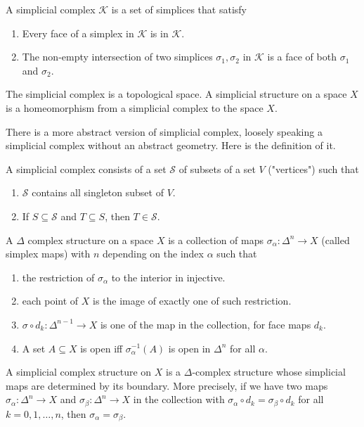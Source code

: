 \begin{definition}
	A simplicial complex \(\mathcal K\) is a set of simplices that satisfy
		\begin{enumerate}
			\item Every face of a simplex in \(\mathcal K\) is in \(\mathcal K\).
			\item The non-empty intersection of two simplices \(\sigma_1, \sigma_2\) in \(\mathcal K\) is a face of both \(\sigma_1\) and \(\sigma_2\). 
		\end{enumerate}
	The simplicial complex is a topological space.
	A simplicial structure on a space \(X\) is a homeomorphism from a simplicial complex to the space \(X\).
	
	There is a more abstract version of simplicial complex, loosely speaking a simplicial complex without an abstract geometry. Here is the definition of it.
	
	A simplicial complex consists of a set \(\mathcal S\) of subsets of a set \(V\) ("vertices") such that 
	\begin{enumerate}
		\item \(\mathcal S\) contains all singleton subset of \(V\).
		\item If \(S \subseteq \mathcal S\) and \(T \subseteq S\), then \(T \in \mathcal S\).
	\end{enumerate}
\end{definition}


\begin{definition}
	A \(\Delta\) complex structure on a space \(X\)	is a collection of maps \(\sigma_\alpha: \Delta^n \to X\) (called simplex maps) with \(n\) depending on the index \(\alpha\) such that 
	\begin{enumerate}
		\item the restriction of \(\sigma_\alpha\) to the interior in injective.
		\item each point of \(X\) is the image of exactly one of such restriction.
		\item \(\sigma \circ d_k : \Delta^{n-1} \to X\) is one of the map in the collection, for face maps \(d_k\).
		\item A set \(A \subseteq X\) is open iff \(\sigma_\alpha^{-1}(A)\) is open in \(\Delta^n\) for all \(\alpha\).
	\end{enumerate}  
\end{definition}

\begin{exercise}
	A simplicial complex structure on \(X\) is a \(\Delta\)-complex structure whose simplicial maps are determined by its boundary. 
	More precisely, if we have two maps \(\sigma_\alpha: \Delta^n \to X\) and \(\sigma_\beta: \Delta^n \to X\) in the collection with \(\sigma_\alpha \circ d_k = \sigma_\beta \circ d_k\) for all \(k = 0, 1, \dots, n\), then \(\sigma_\alpha = \sigma_\beta\).  
\end{exercise}

